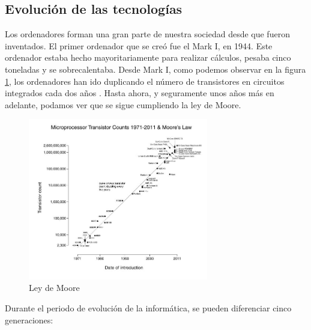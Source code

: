 \documentclass[titlepage, 12pt, a4paper]{article}
\begin{document}
\subsection{Evolución de las tecnologías}
Los ordenadores forman una gran parte de nuestra sociedad desde que fueron inventados. El primer ordenador que se creó fue el Mark I, en 1944. Este ordenador estaba hecho mayoritariamente para realizar cálculos, pesaba cinco toneladas y se sobrecalentaba.
Desde Mark I, como podemos observar en la figura \ref{fig:moore}, los ordenadores han ido duplicando el número de transistores en circuitos integrados cada dos años \cite{moore}. Hasta ahora, y seguramente unos años más en adelante, podamos ver que se sigue cumpliendo la ley de Moore.
\begin{figure}[H]
    \centering
    \includegraphics[width=0.7\textwidth]{Media/moore.jpg}
    \caption{Ley de Moore}
    \label{fig:moore}
\end{figure}
Durante el periodo de evolución de la informática, se pueden diferenciar cinco generaciones:
\end{document}
